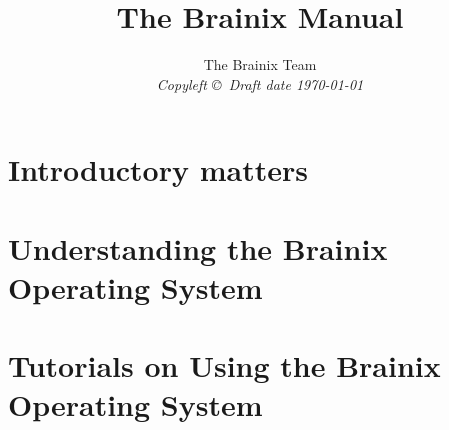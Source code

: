 \documentclass[oneside]{book}
\title{The Brainix Manual}
\author{The Brainix Team  \\
{\small\em Copyleft \copyright \ Draft date \today }}
\date{ }
\begin{document}
\frontmatter


\maketitle
\tableofcontents

\part{Introductory matters}

\mainmatter
\part{Understanding the Brainix Operating System}

%
\part{Tutorials on Using the Brainix Operating System}



\end{document}
